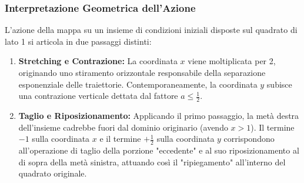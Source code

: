 \documentclass[openany]{book}
\theoremstyle{definition}
\theoremstyle{remark}
\begin{document}
\subsubsection*{Interpretazione Geometrica dell'Azione}
L'azione della mappa su un insieme di condizioni iniziali disposte sul quadrato di lato 1 si articola in due passaggi distinti:
\begin{enumerate}
    \item \textbf{Stretching e Contrazione:} La coordinata $x$ viene moltiplicata per 2, originando uno stiramento orizzontale responsabile della separazione esponenziale delle traiettorie. Contemporaneamente, la coordinata $y$ subisce una contrazione verticale dettata dal fattore $a \le \frac{1}{2}$.
    \item \textbf{Taglio e Riposizionamento:} Applicando il primo passaggio, la metà destra dell'insieme cadrebbe fuori dal dominio originario (avendo $x > 1$). Il termine $-1$ sulla coordinata $x$ e il termine $+\frac{1}{2}$ sulla coordinata $y$ corrispondono all'operazione di taglio della porzione "eccedente" e al suo riposizionamento al di sopra della metà sinistra, attuando così il "ripiegamento" all'interno del quadrato originale.
\end{enumerate}
\end{document}
